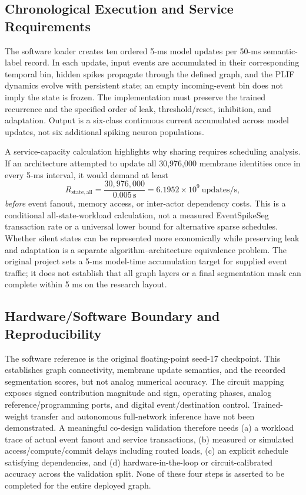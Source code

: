 \documentclass[preprint,12pt,number]{elsarticle}
\begin{document}
\subsection{Chronological Execution and Service Requirements}
The software loader creates ten ordered 5-ms model updates per 50-ms semantic-label record. In each update, input events are accumulated in their corresponding temporal bin, hidden spikes propagate through the defined graph, and the PLIF dynamics evolve with persistent state; an empty incoming-event bin does not imply the state is frozen. The implementation must preserve the trained recurrence and the specified order of leak, threshold/reset, inhibition, and adaptation. Output is a six-class continuous current accumulated across model updates, not six additional spiking neuron populations.

A service-capacity calculation highlights why sharing requires scheduling analysis. If an architecture attempted to update all 30,976,000 membrane identities once in every 5-ms interval, it would demand at least
\begin{equation}
 R_{\mathrm{state,all}}=\frac{30{,}976{,}000}{0.005\,\mathrm{s}}=6.1952\times10^9\ \mathrm{updates/s},
\label{eq:conditional_service}
\end{equation}
\emph{before} event fanout, memory access, or inter-actor dependency costs. This is a conditional all-state-workload calculation, not a measured EventSpikeSeg transaction rate or a universal lower bound for alternative sparse schedules. Whether silent states can be represented more economically while preserving leak and adaptation is a separate algorithm--architecture equivalence problem. The original project sets a 5-ms model-time accumulation target for supplied event traffic; it does not establish that all graph layers or a final segmentation mask can complete within 5 ms on the research layout.

\subsection{Hardware/Software Boundary and Reproducibility}
The software reference is the original floating-point seed-17 checkpoint. This establishes graph connectivity, membrane update semantics, and the recorded segmentation scores, but not analog numerical accuracy. The circuit mapping exposes signed contribution magnitude and sign, operating phases, analog reference/programming ports, and digital event/destination control. Trained-weight transfer and autonomous full-network inference have not been demonstrated. A meaningful co-design validation therefore needs (a) a workload trace of actual event fanout and service transactions, (b) measured or simulated access/compute/commit delays including routed loads, (c) an explicit schedule satisfying dependencies, and (d) hardware-in-the-loop or circuit-calibrated accuracy across the validation split. None of these four steps is asserted to be completed for the entire deployed graph.
\end{document}
